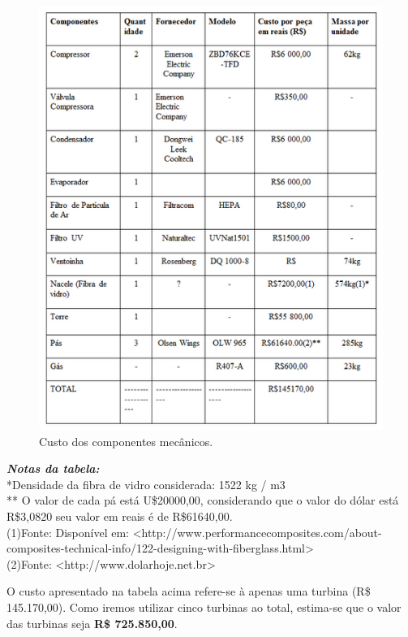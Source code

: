 	\FloatBarrier
	\begin{figure}[!h]
	    \centering
	    \includegraphics[scale = 0.75]{editaveis/figuras/custos_componentes_turbina}
	    \caption[Custo dos componentes mecânicos]{Custo dos componentes mecânicos.}
	    \label{custos_componentes_turbina}
	\end{figure}
	\noindent
	\textbf{\emph{Notas da tabela:}}\\
	\noindent
	*Densidade da fibra de vidro considerada: 1522 kg / m3\\
	** O valor de cada pá está U\$20000,00, considerando que o valor do dólar está R\$3,0820 seu valor em reais é de R\$61640,00.\\
	(1)Fonte: Disponível em: <http://www.performancecomposites.com/about-composites-technical-info/122-designing-with-fiberglass.html>\\
	(2)Fonte: <http://www.dolarhoje.net.br>
	
	O custo apresentado na tabela acima refere-se à apenas uma turbina (R\$ 145.170,00).
	Como iremos utilizar cinco turbinas ao total, estima-se que o valor das turbinas seja \textbf{R\$ 725.850,00}.

